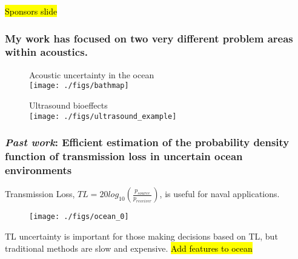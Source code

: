 
\embedfile{\jobname}
%

\newcommand{\orderof}[1]{\ensuremath{\mathcal{O}\left(#1\right)}}






\begin{frame}
  \centering
  \begin{center}
    \hl{Sponsors slide}
  \end{center}
\end{frame}

\begin{frame} \frametitle{My work has focused on two very different problem areas within acoustics.}
  \begin{minipage}{0.48\textwidth}
    \begin{figure}
      Acoustic uncertainty in the ocean \vspace*{4pt}\\
      \centering
      \texttt{[image: ./figs/bathmap]}
    \end{figure}
  \end{minipage}
  \hfill
  \begin{minipage}{0.48\textwidth}
    \begin{figure}
      \centering
      Ultrasound bioeffects \vspace*{4pt}\\
      \texttt{[image: ./figs/ultrasound\_example]}
    \end{figure}
  \end{minipage}
\end{frame}
\begin{frame} \frametitle{\textit{Past work}: Efficient estimation of the probability density function of transmission loss in uncertain ocean environments}
{\small
\vspace*{0.25cm}
Transmission Loss, $TL=20log_{10}\left(\frac{p_{source}}{p_{receiver}}\right)$, is useful for naval applications.
\vspace*{0.25cm}
\begin{figure}
  \centering
  \texttt{[image: ./figs/ocean\_0]}
\end{figure}
TL uncertainty is important for those making decisions based on TL,
but traditional methods are slow and expensive.  \hl{Add features to
  ocean} }
\end{frame}
